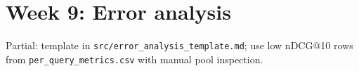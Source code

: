 \section{Week 9: Error analysis}
Partial: template in \texttt{src/error\_analysis\_template.md}; use low nDCG@10 rows from \texttt{per\_query\_metrics.csv} with manual pool inspection.
